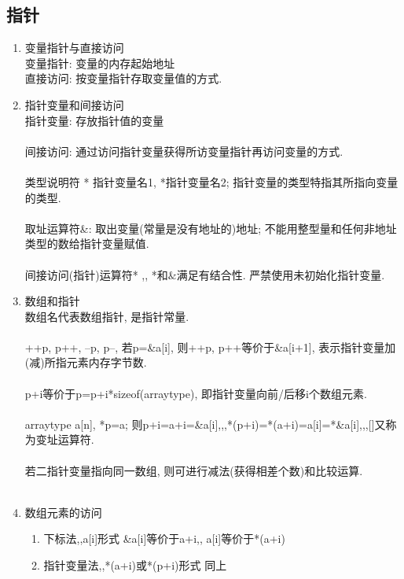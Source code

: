 \documentclass[a4paper,10pt,english]{article}
\begin{document}
\subsection{指针}
\begin{enumerate}
\item {变量指针与直接访问} \\
变量指针: 变量的内存起始地址 \\
直接访问: 按变量指针存取变量值的方式. \\

\item {指针变量和间接访问}\\
指针变量: 存放指针值的变量 \\\\
间接访问: 通过访问指针变量获得所访变量指针再访问变量的方式. \\\\
类型说明符 * 指针变量名1, *指针变量名2; 指针变量的类型特指其所指向变量的类型. \\\\
取址运算符\&: 取出变量(常量是没有地址的)地址; 不能用整型量和任何非地址类型的数给指针变量赋值. \\\\
间接访问(指针)运算符* ,, *和$\&$满足有结合性. 严禁使用未初始化指针变量.\\

\item {数组和指针}\\
数组名代表数组指针, 是指针常量. \\\\
++p, p++, --p, p--, 若p=\&a[i], 则++p, p++等价于\&a[i+1], 表示指针变量加(减)所指元素内存字节数. \\\\
p+i等价于p=p+i*sizeof(arraytype), 即指针变量向前/后移i个数组元素. \\\\
arraytype a[n], *p=a; 则p+i=a+i=\&a[i],,,*(p+i)=*(a+i)=a[i]=*\&a[i],,,[]又称为变址运算符. \\\\
若二指针变量指向同一数组, 则可进行减法(获得相差个数)和比较运算. \\\\

\item {数组元素的访问}
\begin{enumerate}
\item {下标法,,a[i]形式}
\&a[i]等价于a+i,, a[i]等价于*(a+i)

\item {指针变量法,,*(a+i)或*(p+i)形式}
同上


\end{enumerate}
\end{enumerate}
\end{document}
